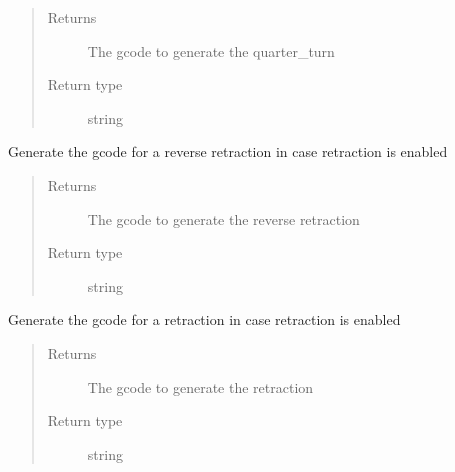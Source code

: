 \documentclass[letterpaper,10pt,english]{sphinxmanual}
\begin{document}
\begin{fulllineitems}
\begin{fulllineitems}
\begin{quote}
\begin{description}
\begin{itemize}
\end{itemize}

\item[{Returns}] \leavevmode
\sphinxAtStartPar
The gcode to generate the quarter\_turn

\item[{Return type}] \leavevmode
\sphinxAtStartPar
string

\end{description}\end{quote}

\end{fulllineitems}


\begin{fulllineitems}
\label{\detokenize{index:generator.generator.reretract}}
\sphinxAtStartPar
Generate the gcode for a reverse retraction in case retraction is enabled
\begin{quote}\begin{description}
\item[{Returns}] \leavevmode
\sphinxAtStartPar
The gcode to generate the reverse retraction

\item[{Return type}] \leavevmode
\sphinxAtStartPar
string

\end{description}\end{quote}

\end{fulllineitems}


\begin{fulllineitems}
\label{\detokenize{index:generator.generator.retract}}
\sphinxAtStartPar
Generate the gcode for a retraction in case retraction is enabled
\begin{quote}\begin{description}
\item[{Returns}] \leavevmode
\sphinxAtStartPar
The gcode to generate the retraction

\item[{Return type}] \leavevmode
\sphinxAtStartPar
string


\end{description}
\end{quote}
\end{fulllineitems}
\end{fulllineitems}
\end{document}

